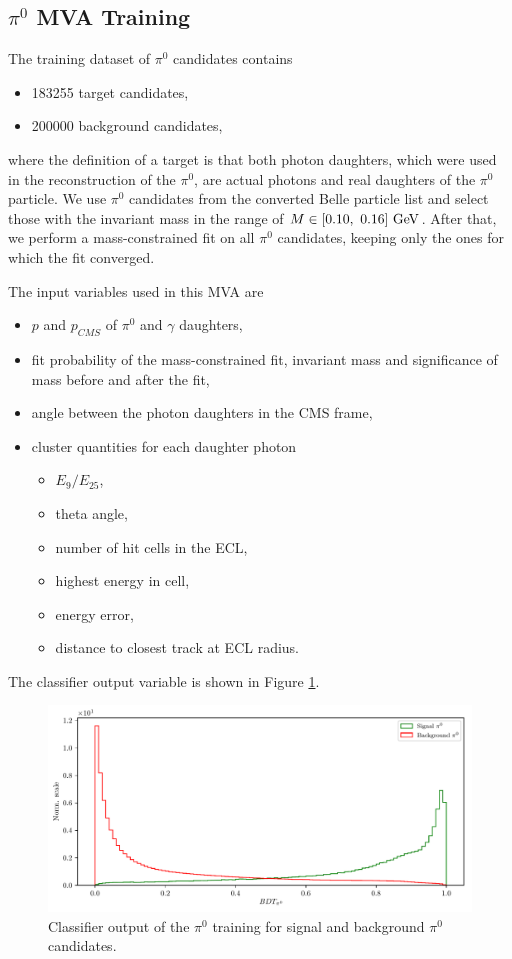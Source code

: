 \subsection{\texorpdfstring{$\pi^0$}{π0} MVA Training}

The training dataset of $\pi^0$ candidates contains
\begin{itemize}
	\item 183255 target candidates,
	\item 200000 background candidates,
\end{itemize}
where the definition of a target is that both photon daughters, which were used in the reconstruction of the $\pi^0$, are actual photons and real daughters of the $\pi^0$ particle. We use $\pi^0$ candidates from the converted Belle particle list and select those with the invariant mass in the range of $M \in [0.10,~0.16]\mathrm{~GeV}$. After that, we perform a mass-constrained fit on all $\pi^0$ candidates, keeping only the ones for which the fit converged. 

The input variables used in this MVA are
\begin{itemize}
	\item $p$ and $p_{CMS}$ of $\pi^0$ and $\gamma$ daughters,
	\item fit probability of the mass-constrained fit, invariant mass and significance of mass before and after the fit,
	\item angle between the photon daughters in the CMS frame,
	\item cluster quantities for each daughter photon
	\begin{itemize}
		\item $E_9/E_{25}$,
		\item theta angle,
		\item number of hit cells in the ECL,
		\item highest energy in cell,
		\item energy error,
		\item distance to closest track at ECL radius.
	\end{itemize}
\end{itemize}

The classifier output variable is shown in Figure \ref{fig:ROE_pi0}.

\begin{figure}[H]
	\centering
	\captionsetup{width=0.8\linewidth}
	\includegraphics[width=\linewidth]{fig/ROECleanup_pi0}
	\caption{Classifier output of the $\pi^0$ training for signal and background $\pi^0$ candidates.}
	\label{fig:ROE_pi0}
\end{figure}


